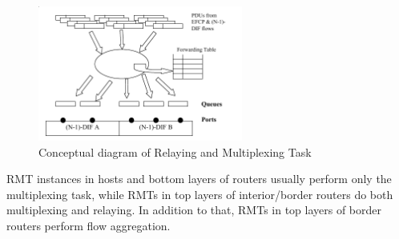             \begin{figure}[H]
                \begin{center}
                    \includegraphics[width=0.6\textwidth]{fig/fwding_rmt-module.png}
                  \caption{Conceptual diagram of Relaying and Multiplexing Task}
                  \label{fig:rmt1}
                \end{center}
            \end{figure}

            RMT instances in hosts and bottom layers of routers usually perform only the multiplexing task, while RMTs in top layers of interior/border routers do both multiplexing and relaying. In addition to that, RMTs in top layers of border routers perform flow aggregation.

